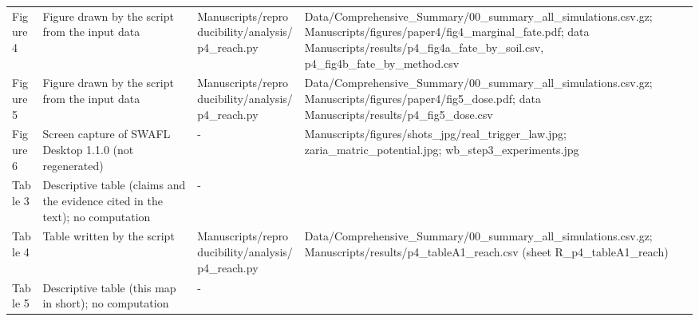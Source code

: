 {\begin{longtable}{p{}p{}p{}p{}}
{}Figure 4 & Figure drawn by the script from the input data & Manuscripts/\allowbreak{}reproducibility/\allowbreak{}analysis/\allowbreak{}p4\_\allowbreak{}reach.py & Data/\allowbreak{}Comprehensive\_\allowbreak{}Summary/\allowbreak{}00\_\allowbreak{}summary\_\allowbreak{}all\_\allowbreak{}simulations.csv.gz;  Manuscripts/\allowbreak{}figures/\allowbreak{}paper4/\allowbreak{}fig4\_\allowbreak{}marginal\_\allowbreak{}fate.pdf;  data Manuscripts/\allowbreak{}results/\allowbreak{}p4\_\allowbreak{}fig4a\_\allowbreak{}fate\_\allowbreak{}by\_\allowbreak{}soil.csv, p4\_\allowbreak{}fig4b\_\allowbreak{}fate\_\allowbreak{}by\_\allowbreak{}method.csv\\
{}Figure 5 & Figure drawn by the script from the input data & Manuscripts/\allowbreak{}reproducibility/\allowbreak{}analysis/\allowbreak{}p4\_\allowbreak{}reach.py & Data/\allowbreak{}Comprehensive\_\allowbreak{}Summary/\allowbreak{}00\_\allowbreak{}summary\_\allowbreak{}all\_\allowbreak{}simulations.csv.gz;  Manuscripts/\allowbreak{}figures/\allowbreak{}paper4/\allowbreak{}fig5\_\allowbreak{}dose.pdf;  data Manuscripts/\allowbreak{}results/\allowbreak{}p4\_\allowbreak{}fig5\_\allowbreak{}dose.csv\\
{}Figure 6 & Screen capture of SWAFL Desktop 1.1.0 (not regenerated) & - & Manuscripts/\allowbreak{}figures/\allowbreak{}shots\_\allowbreak{}jpg/\allowbreak{}real\_\allowbreak{}trigger\_\allowbreak{}law.jpg;  zaria\_\allowbreak{}matric\_\allowbreak{}potential.jpg;  wb\_\allowbreak{}step3\_\allowbreak{}experiments.jpg\\
{}Table 3 & Descriptive table (claims and the evidence cited in the text); no computation & - & \\
{}Table 4 & Table written by the script & Manuscripts/\allowbreak{}reproducibility/\allowbreak{}analysis/\allowbreak{}p4\_\allowbreak{}reach.py & Data/\allowbreak{}Comprehensive\_\allowbreak{}Summary/\allowbreak{}00\_\allowbreak{}summary\_\allowbreak{}all\_\allowbreak{}simulations.csv.gz;  Manuscripts/\allowbreak{}results/\allowbreak{}p4\_\allowbreak{}tableA1\_\allowbreak{}reach.csv (sheet R\_\allowbreak{}p4\_\allowbreak{}tableA1\_\allowbreak{}reach)\\
{}Table 5 & Descriptive table (this map in short); no computation & - & \\
\bottomrule\end{longtable}}
